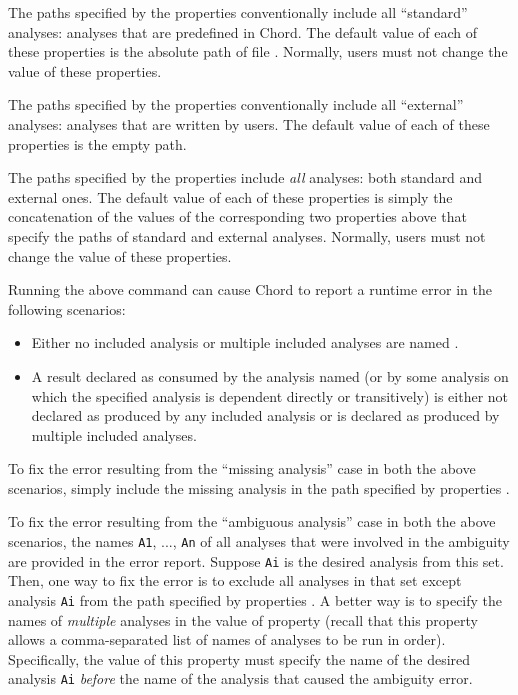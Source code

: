 The paths specified by the  properties
conventionally include all ``standard'' analyses: analyses that are predefined
in Chord.  The default value of each of these properties is the absolute path
of file .  Normally, users must not change the value of these
properties.

The paths specified by the  properties
conventionally include all ``external'' analyses: analyses that are written by
users.  The default value of each of these properties is the empty path.

The paths specified by the  properties include
{\it all} analyses: both standard and external ones.  The default value of each
of these properties is simply the concatenation of the values of the
corresponding two properties above that specify the paths of standard and
external analyses.  Normally, users must not change the value of these
properties.

Running the above command can cause Chord to report a runtime error in the
following scenarios:

\begin{itemize}
\item
Either no included analysis or multiple included analyses are named
.
\item
A result declared as consumed by the analysis named 
(or by some analysis on which the specified analysis is dependent directly or
transitively) is either not declared as produced by any included analysis or
is declared as produced by multiple included analyses.
\end{itemize}

To fix the error resulting from the ``missing analysis'' case in both the above
scenarios, simply include the missing analysis in the path specified by
properties .

To fix the error resulting from the ``ambiguous analysis'' case in both the
above scenarios, the names {\tt A1}, ..., {\tt An} of all analyses that were
involved in the ambiguity are provided in the error report.  Suppose {\tt Ai}
is the desired analysis from this set.  Then, one way to fix the error is to
exclude all analyses in that set except analysis {\tt Ai} from the path
specified by properties .  A better way is to
specify the names of {\it multiple} analyses in the value of property
 (recall that this property allows a comma-separated
list of names of analyses to be run in order).  Specifically, the value of
this property must specify the name of the desired analysis {\tt Ai}
{\it before} the name of the analysis that caused the ambiguity error.

